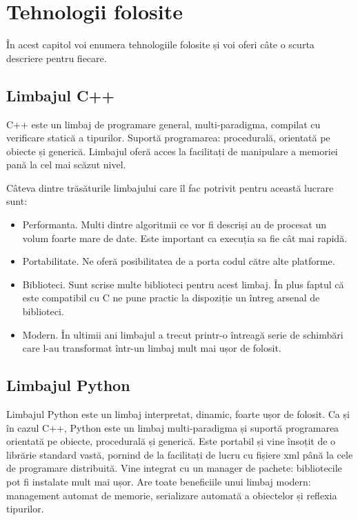 \chapter{Tehnologii folosite}

În acest capitol voi enumera tehnologiile folosite și voi oferi câte o scurta descriere pentru fiecare.

\section{Limbajul C++}

C++ este un limbaj de programare general, multi-paradigma, compilat cu verificare statică a tipurilor.
Suportă programarea: procedurală, orientată pe obiecte și generică.
Limbajul oferă acces la facilitați de manipulare a memoriei pană la cel mai scăzut nivel.

Câteva dintre trăsăturile limbajului care îl fac potrivit pentru această lucrare sunt:
\begin{itemize}
	\item Performanta. Multi dintre algoritmii ce vor fi descriși au de procesat un volum foarte mare de date. Este important ca execuția sa fie cât mai rapidă.
	\item Portabilitate. Ne oferă posibilitatea de a porta codul către alte platforme.
	\item Biblioteci. Sunt scrise multe biblioteci pentru acest limbaj. În plus faptul că este compatibil cu C ne pune practic la dispoziție un întreg arsenal de biblioteci.
	\item Modern. În ultimii ani limbajul a trecut printr-o întreagă serie de schimbări care l-au transformat într-un limbaj mult mai ușor de folosit.
\end{itemize}


\section{Limbajul Python}

Limbajul Python este un limbaj interpretat, dinamic, foarte ușor de folosit.
Ca și în cazul C++, Python este un limbaj multi-paradigma și suportă programarea orientată pe obiecte, procedurală și generică.
Este portabil și vine însoțit de o librărie standard vastă, pornind de la facilitați de lucru cu fișiere xml până la cele de programare distribuită.
Vine integrat cu un manager de pachete: bibliotecile pot fi instalate mult mai ușor.
Are toate beneficiile unui limbaj modern: management automat de memorie, serializare automată a obiectelor și reflexia tipurilor.

